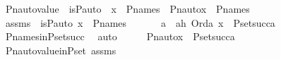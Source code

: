 \begin{isabellebody}
%
\endisatagproof
{\isafoldproof}%
%
\isadelimproof
\isanewline
%
\endisadelimproof
\isanewline
{}\isamarkupfalse%
\ Pn{\isacharunderscore}{\kern0pt}auto{\isacharunderscore}{\kern0pt}value\ {\isacharcolon}{\kern0pt}\ {\isachardoublequoteopen}is{\isacharunderscore}{\kern0pt}P{\isacharunderscore}{\kern0pt}auto{\isacharparenleft}{\kern0pt}{\isasympi}{\isacharparenright}{\kern0pt}\ {\isasymLongrightarrow}\ x\ {\isasymin}\ P{\isacharunderscore}{\kern0pt}names\ {\isasymLongrightarrow}\ Pn{\isacharunderscore}{\kern0pt}auto{\isacharparenleft}{\kern0pt}{\isasympi}{\isacharparenright}{\kern0pt}{\isacharbackquote}{\kern0pt}x\ {\isasymin}\ P{\isacharunderscore}{\kern0pt}names{\isachardoublequoteclose}\ \isanewline
%
\isadelimproof
%
\endisadelimproof
%
\isatagproof
{}\isamarkupfalse%
\ {\isacharminus}{\kern0pt}\ \isanewline
\ \ \isamarkupfalse%
\ assms\ {\isacharcolon}{\kern0pt}\ {\isachardoublequoteopen}is{\isacharunderscore}{\kern0pt}P{\isacharunderscore}{\kern0pt}auto{\isacharparenleft}{\kern0pt}{\isasympi}{\isacharparenright}{\kern0pt}{\isachardoublequoteclose}\ {\isachardoublequoteopen}x\ {\isasymin}\ P{\isacharunderscore}{\kern0pt}names{\isachardoublequoteclose}\ \isanewline
\ \ \isamarkupfalse%
\ \isamarkupfalse%
\ a\ \ ah\ {\isacharcolon}{\kern0pt}{\isachardoublequoteopen}Ord{\isacharparenleft}{\kern0pt}a{\isacharparenright}{\kern0pt}{\isachardoublequoteclose}\ {\isachardoublequoteopen}x\ {\isasymin}\ P{\isacharunderscore}{\kern0pt}set{\isacharparenleft}{\kern0pt}succ{\isacharparenleft}{\kern0pt}a{\isacharparenright}{\kern0pt}{\isacharparenright}{\kern0pt}{\isachardoublequoteclose}\ \isamarkupfalse%
\ P{\isacharunderscore}{\kern0pt}names{\isacharunderscore}{\kern0pt}in{\isacharunderscore}{\kern0pt}P{\isacharunderscore}{\kern0pt}set{\isacharunderscore}{\kern0pt}succ\ \isamarkupfalse%
\ auto\isanewline
\ \ \isamarkupfalse%
\ \isamarkupfalse%
\ {\isachardoublequoteopen}Pn{\isacharunderscore}{\kern0pt}auto{\isacharparenleft}{\kern0pt}{\isasympi}{\isacharparenright}{\kern0pt}{\isacharbackquote}{\kern0pt}x\ {\isasymin}\ P{\isacharunderscore}{\kern0pt}set{\isacharparenleft}{\kern0pt}succ{\isacharparenleft}{\kern0pt}a{\isacharparenright}{\kern0pt}{\isacharparenright}{\kern0pt}{\isachardoublequoteclose}\ \isamarkupfalse%
\ Pn{\isacharunderscore}{\kern0pt}auto{\isacharunderscore}{\kern0pt}value{\isacharunderscore}{\kern0pt}in{\isacharunderscore}{\kern0pt}P{\isacharunderscore}{\kern0pt}set\ assms\ \isamarkupfalse%

\end{isabellebody}
